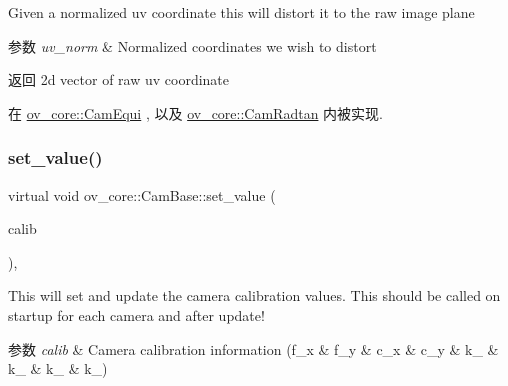 Given a normalized uv coordinate this will distort it to the raw image plane 


\begin{DoxyParams}{参数}
{\em uv\+\_\+norm} & Normalized coordinates we wish to distort \\
\hline
\end{DoxyParams}
\begin{DoxyReturn}{返回}
2d vector of raw uv coordinate 
\end{DoxyReturn}


在 \hyperlink{classov__core_1_1CamEqui_ac35e3814d053f66a32644321691d8e0f}{ov\+\_\+core\+::\+Cam\+Equi} , 以及 \hyperlink{classov__core_1_1CamRadtan_a022376b5a15b827bbb7dabebc8df0508}{ov\+\_\+core\+::\+Cam\+Radtan} 内被实现.

\mbox{\label{classov__core_1_1CamBase_a630f35e703c3893ae694fe0f14693216}} 
\subsubsection{\texorpdfstring{set\+\_\+value()}{set\_value()}}
{\footnotesize\ttfamily virtual void ov\+\_\+core\+::\+Cam\+Base\+::set\+\_\+value (\begin{DoxyParamCaption}\item[{const Eigen\+::\+Matrix\+Xd \&}]{calib }\end{DoxyParamCaption})\hspace{0.3cm}{\ttfamily [inline]}, {\ttfamily [virtual]}}



This will set and update the camera calibration values. This should be called on startup for each camera and after update! 


\begin{DoxyParams}{参数}
{\em calib} & Camera calibration information (f\+\_\+x \& f\+\_\+y \& c\+\_\+x \& c\+\_\+y \& k\+\_ \& k\+\_ \& k\+\_ \& k\+\_) \\
\hline
\end{DoxyParams}
\mbox{\label{classov__core_1_1CamBase_a42b140a7dfc1398cc7fc2f8df6c141d2}} 
